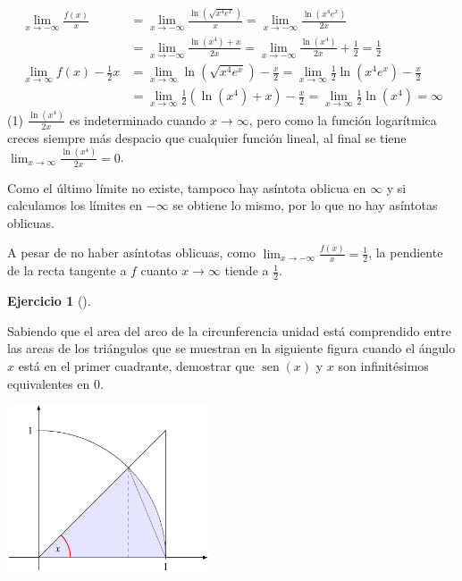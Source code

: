 \documentclass[
  spanish,
  a4paper,
]{scrreport}
\theoremstyle{definition}
\newtheorem{exercise}{Ejercicio}[chapter]
\theoremstyle{remark}
\begin{document}
\begin{tcolorbox}
\begin{align*}
\lim_{x\to -\infty} \frac{f(x)}{x}
&= \lim_{x\to -\infty} \frac{\ln(\sqrt{x^4e^x})}{x}
= \lim_{x\to -\infty} \frac{\ln(x^4e^x)}{2x} \\
&= \lim_{x\to -\infty} \frac{\ln(x^4)+x}{2x} 
= \lim_{x\to -\infty} \frac{\ln(x^4)}{2x} + \frac{1}{2}
= \frac{1}{2} \tag{1}\\
\lim_{x\to \infty} f(x) -\frac{1}{2}x
&= \lim_{x\to \infty} \ln(\sqrt{x^4e^x}) - \frac{x}{2}
= \lim_{x\to \infty} \frac{1}{2}\ln(x^4e^x) - \frac{x}{2} \\
&= \lim_{x\to \infty} \frac{1}{2}(\ln(x^4)+x) - \frac{x}{2}
= \lim_{x\to \infty} \frac{1}{2}\ln(x^4)
= \infty
\end{align*} (1) \(\frac{\ln(x^4)}{2x}\) es indeterminado cuando
\(x\to\infty\), pero como la función logarítmica creces siempre más
despacio que cualquier función lineal, al final se tiene
\(\lim_{x\to\infty} \frac{\ln(x^4)}{2x} = 0\).

Como el último límite no existe, tampoco hay asíntota oblicua en
\(\infty\) y si calculamos los límites en \(-\infty\) se obtiene lo
mismo, por lo que no hay asíntotas oblicuas.

A pesar de no haber asíntotas oblicuas, como
\(\lim_{x\to -\infty} \frac{f(x)}{x} =\frac{1}{2}\), la pendiente de la
recta tangente a \(f\) cuanto \(x\to \infty\) tiende a \(\frac{1}{2}\).

\end{tcolorbox}

\begin{exercise}[]\protect\hypertarget{exr-4}{}\label{exr-4}

Sabiendo que el area del arco de la circunferencia unidad está
comprendido entre las areas de los triángulos que se muestran en la
siguiente figura cuando el ángulo \(x\) está en el primer cuadrante,
demostrar que \(\operatorname{sen}(x)\) y \(x\) son infinitésimos
equivalentes en \(0\).

\includegraphics[width=6cm,height=5cm]{img/examen-2024-01-11/arco-circunferencia.pdf}

\end{exercise}
\end{document}
